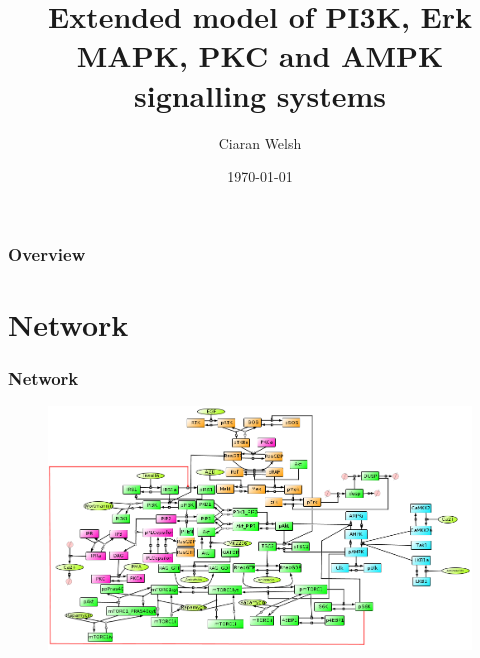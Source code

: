 \documentclass{beamer}
\title[ExtendedModel]{Extended model of PI3K, Erk MAPK, PKC and AMPK signalling systems} %
\author{Ciaran Welsh} %
\institute[Newcastle University] %
{
Newcastle University \\ %
\medskip
\textit{ciaran.welsh@newcastle.ac.uk} %
}
\date{\today} %
\begin{document}
\begin{frame}
\titlepage %
\end{frame}

\begin{frame}
\frametitle{Overview} %
\tableofcontents %
\end{frame}


\section{Network} %
\begin{frame}
\frametitle{Network}
\begin{figure}
    \centering
    \includegraphics[width=\textwidth]{../Networks/extended_network.png}
\end{figure}
\end{frame}
\end{document}
